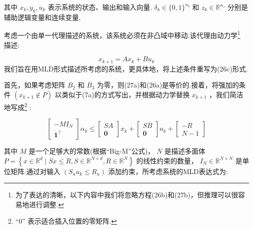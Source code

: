 \documentclass[10pt]{article}
\begin{document}
其中 \({x}_{k},{y}_{k},{u}_{k}\) 表示系统的状态、输出和输入向量. \({\delta }_{k} \in  \{ 0,1{\} }^{{n}_{\delta }}\) 和 \({z}_{k} \in  {\mathbb{R}}^{{n}_{z}}\) 分别是辅助逻辑变量和连续变量.

考虑一个由单一代理描述的系统，该系统必须在非凸域中移动.该代理由动力学\footnote{为了表达的清晰，以下内容中我们将忽略方程(26b)和(27b)，但推理可以很容易地进行调整.} 描述:

\begin{subequations}
\begin{equation}
{x}_{k + 1} = A{x}_{k} + B{u}_{k}
\end{equation}
\end{subequations}
我们旨在用MLD形式描述所考虑的系统，更具体地，将上述条件重写为(26c)形式.

首先，如果考虑矩阵 \({B}_{2}\) 和 \({B}_{3}\) 为零，则(27a)和(26a)是等价的.接着，将强加的条件 \(\left( {{x}_{k + 1} \notin  P}\right)\) 以类似于(7a)的方式写出，并根据动力学替换 \({x}_{k + 1}\) ，我们简洁地写成\footnote{“0” 表示适合插入位置的零矩阵.} :

\begin{equation}
\left\lbrack  \begin{matrix}  - M{I}_{N} \\  {\mathbf{1}}^{\top } \end{matrix}\right\rbrack  {\alpha }_{k} \leq  \left\lbrack  \begin{matrix} {SA} \\  \mathbf{0} \end{matrix}\right\rbrack  {x}_{k} + \left\lbrack  \begin{matrix} {SB} \\  \mathbf{0} \end{matrix}\right\rbrack  {u}_{k} + \left\lbrack  \begin{matrix}  - R \\  N - 1 \end{matrix}\right\rbrack
\end{equation}

其中 \(M\) 是一个足够大的常数(根据“Big-M”公式)， \(N\) 是描述多面体 \(P = \left\{  {x \in  {\mathbb{R}}^{d} \mid  {Sx} \leq  R,S \in  {\mathbb{R}}^{N \times  d},R \in  {\mathbb{R}}^{N}}\right\}\) 的线性约束的数量， \({I}_{N} \in  {\mathbb{R}}^{N \times  N}\) 是单位矩阵.通过对输入 \(\left( {{S}_{u}{u}_{k} \leq  {R}_{u}}\right)\) 添加约束，所考虑系统的MLD表达式为:
\end{document}
